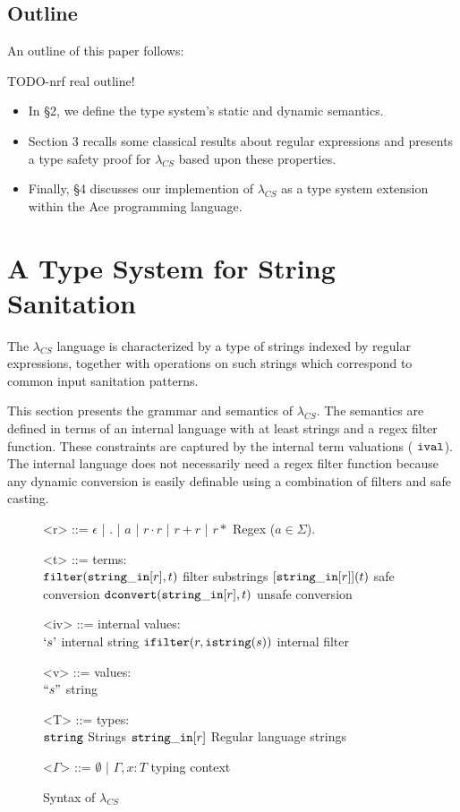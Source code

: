 \documentclass[10pt,preprint]{sigplanconf}
\theoremstyle{definition}
\newcommand{\strin}{{\tt string\_in}}
\newcommand{\str}{ {\tt string} }
\newcommand{\istr}{ {\tt istring} }
\newcommand{\dconvert}[2]{ {\tt dconvert}(#1,#2) }
\newcommand{\filter}[2]{ {\tt filter}(#1,#2) }
\newcommand{\ival}{ \ {\tt ival} }
\newcommand{\istrf}[1]{`#1\textrm'} %
\newcommand{\strf}[1]{``#1"}
\newcommand{\lcs}{\lambda_{CS}}
\begin{document}
\subsection{Outline}

An outline of this paper follows:

TODO-nrf real outline!
\begin{itemize}
  \item In \S 2, we define the type system's static and dynamic semantics.
  \item Section 3 recalls some classical results about regular expressions and presents a type safety proof for $\lcs$ based upon these properties.
  \item Finally, \S 4 discusses our implemention of $\lcs$ as a type system extension  within the Ace programming language.
\end{itemize}

\section{A Type System for String Sanitation}

The $\lcs$ language is characterized by a type of strings indexed by regular
expressions, together with operations on such strings which correspond to common
input sanitation patterns.

This section presents the grammar and semantics of $\lcs$.
The semantics are defined in terms of an internal language with at least strings and a regex filter function.
These constraints are captured by the internal term valuations ($\ival$).
The internal language does not necessarily need a regex filter function because
any dynamic conversion is easily definable using a combination of filters and safe
casting.

%
%
\begin{figure}
\begin{grammar}
<r> ::= $\epsilon$ | $.$ | $a$ | $r \cdot r$ | $r + r$ | $r*$ \hfill Regex ($a \in \Sigma$).

<t> ::= 			\hfill terms: 					\\
$\filter{\strin[r]}{t}$ 		\hfill filter substrings			\alt
$[\strin[r]](t)$ \hfill safe conversion \alt
$\dconvert{\strin[r]}{t}$ \hfill unsafe conversion

<iv> ::= 			\hfill internal values:					\\
$\istrf{s}$				\hfill internal string \alt
${\tt ifilter}(r, \istr(s))$ \hfill internal filter

<v> ::= \hfill values: \\
$\strf{s}$ \hfill string

<T> ::=				\hfill	types:					\\
$\str$  \hfill Strings \alt
$\strin[r]$				\hfill Regular language strings		

<$\Gamma$> ::=	$\emptyset$	 | $\Gamma,x:T$ \hfill typing context
\end{grammar}
\caption{Syntax of $\lcs$}
\label{fig:lcsSyntax}
\end{figure}
\end{document}
